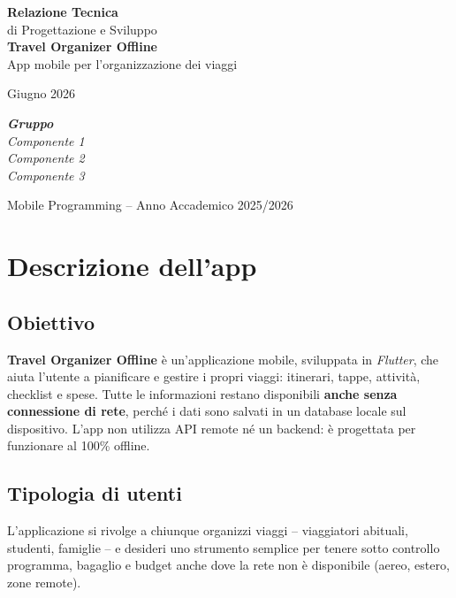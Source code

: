 \documentclass[11pt, a4paper]{article}
\begin{document}
\begin{titlepage}
    \centering
    \vspace*{2.5cm}
    {\Huge \textbf{Relazione Tecnica}}\\[0.4cm]
    {\Large di Progettazione e Sviluppo}\\[1.5cm]
    {\Huge \textbf{Travel Organizer Offline}}\\[0.5cm]
    {\large App mobile per l'organizzazione dei viaggi}\\[2cm]

    {\Large Giugno 2026\par}
    \vfill
    \begin{flushright}
        \textbf{\textit{Gruppo}}\\
        \textit{Componente 1}\\
        \textit{Componente 2}\\
        \textit{Componente 3}\par
    \end{flushright}
    \vspace{2cm}
    \Large Mobile Programming -- Anno Accademico 2025/2026
\end{titlepage}

\tableofcontents
\newpage

\section{Descrizione dell'app}

\subsection{Obiettivo}
\textbf{Travel Organizer Offline} è un'applicazione mobile, sviluppata in
\textit{Flutter}, che aiuta l'utente a pianificare e gestire i propri viaggi:
itinerari, tappe, attività, checklist e spese. Tutte le informazioni restano
disponibili \textbf{anche senza connessione di rete}, perché i dati sono salvati
in un database locale sul dispositivo. L'app non utilizza API remote né un
backend: è progettata per funzionare al 100\% offline.

\subsection{Tipologia di utenti}
L'applicazione si rivolge a chiunque organizzi viaggi -- viaggiatori abituali,
studenti, famiglie -- e desideri uno strumento semplice per tenere sotto
controllo programma, bagaglio e budget anche dove la rete non è disponibile
(aereo, estero, zone remote).
\end{document}
